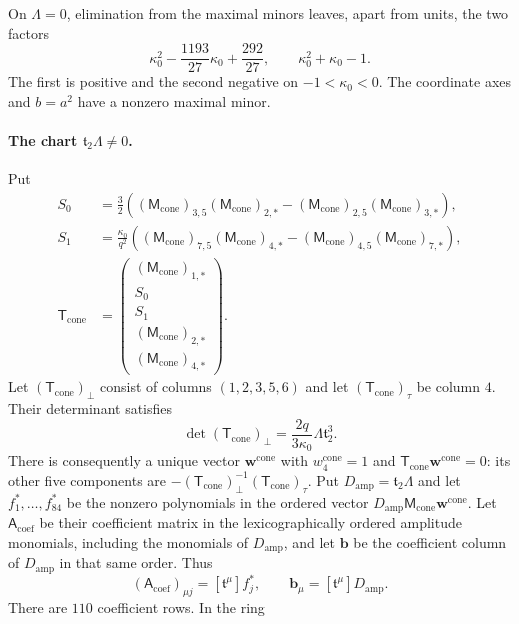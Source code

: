 \documentclass[11pt,a4paper]{article}
\numberwithin{equation}{section}
\theoremstyle{plain}
\theoremstyle{definition}
\theoremstyle{remark}
\begin{document}
On $\Lambda=0$, elimination from the maximal minors leaves, apart
from units, the two factors
\[
 \kappa_0^2-\frac{1193}{27}\kappa_0+\frac{292}{27},\qquad
 \kappa_0^2+\kappa_0-1.
\]
The first is positive and the second negative on $-1<\kappa_0<0$.
The coordinate axes and $b=a^2$ have a nonzero maximal minor.

\paragraph{The chart $\mathfrak t_2\Lambda\ne0$.}
Put
\[
 \begin{aligned}
 S_0&=\tfrac32((\mathsf M_{\mathrm{cone}})_{3,5}(\mathsf M_{\mathrm{cone}})_{2,*}-(\mathsf M_{\mathrm{cone}})_{2,5}(\mathsf M_{\mathrm{cone}})_{3,*}),\\
 S_1&=\frac{\kappa_0}{q^2}
          ((\mathsf M_{\mathrm{cone}})_{7,5}(\mathsf M_{\mathrm{cone}})_{4,*}-(\mathsf M_{\mathrm{cone}})_{4,5}(\mathsf M_{\mathrm{cone}})_{7,*}),\\
 \mathsf T_{\mathrm{cone}}&=\begin{pmatrix}(\mathsf M_{\mathrm{cone}})_{1,*}\\S_0\\S_1\\(\mathsf M_{\mathrm{cone}})_{2,*}\\(\mathsf M_{\mathrm{cone}})_{4,*}\end{pmatrix}.
 \end{aligned}
\]
Let $(\mathsf T_{\mathrm{cone}})_\perp$ consist of columns $(1,2,3,5,6)$ and let $(\mathsf T_{\mathrm{cone}})_\tau$
be column $4$. Their determinant satisfies
\[
 \det (\mathsf T_{\mathrm{cone}})_\perp=\frac{2q}{3\kappa_0}\Lambda\mathfrak t_2^3.
\]
There is consequently a unique vector $\boldsymbol w^{\mathrm{cone}}$ with $w_4^{\mathrm{cone}}=1$ and $\mathsf T_{\mathrm{cone}}\boldsymbol w^{\mathrm{cone}}=0$:
its other five components are $-(\mathsf T_{\mathrm{cone}})_\perp^{-1}(\mathsf T_{\mathrm{cone}})_\tau$.
Put $D_{\mathrm{amp}}=\mathfrak t_2\Lambda$ and let $f_1^*,\ldots,f_{84}^*$ be
the nonzero polynomials in the ordered vector $D_{\mathrm{amp}}\mathsf M_{\mathrm{cone}}\boldsymbol w^{\mathrm{cone}}$.
Let $\mathsf A_{\mathrm{coef}}$ be their coefficient matrix in the lexicographically
ordered amplitude monomials, including the monomials of $D_{\mathrm{amp}}$, and let
$\mathbf b$ be the coefficient column of $D_{\mathrm{amp}}$ in that same order.
Thus
\[
 (\mathsf A_{\mathrm{coef}})_{\mu j}=[\mathfrak t^\mu]f_j^*,\qquad
 \mathbf b_\mu=[\mathfrak t^\mu]D_{\mathrm{amp}}.
\]
There are $110$ coefficient rows. In the ring
\end{document}
